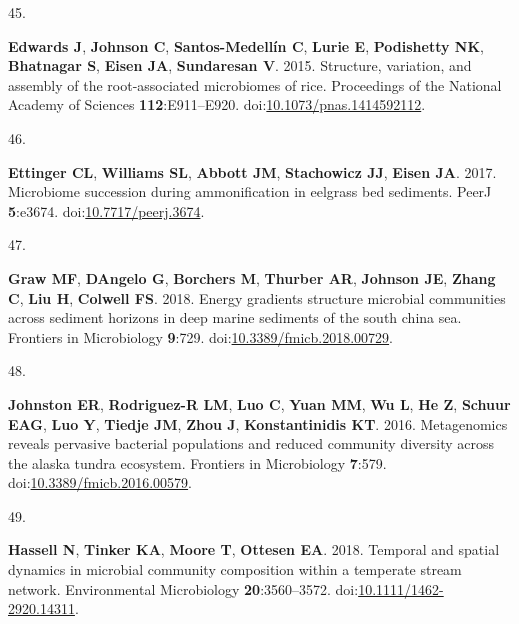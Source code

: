\documentclass[
]{article}
\newlength{\cslhangindent}
\newlength{\csllabelwidth}
\newlength{\cslentryspacingunit} %
\newenvironment{CSLReferences}[2] %
 {%
  \setlength{\parindent}{0pt}
  \ifodd #1
  \let\oldpar\par
  \def\par{\hangindent=\cslhangindent\oldpar}
  \fi
  \setlength{\parskip}{#2\cslentryspacingunit}
 }%
 {}
\newcommand{\CSLLeftMargin}[1]{\parbox[t]{\csllabelwidth}{#1}}
\newcommand{\CSLRightInline}[1]{\parbox[t]{\linewidth - \csllabelwidth}{#1}\break}
\begin{document}
\begin{CSLReferences}{0}{1}
\leavevmode{}%
\CSLLeftMargin{45. }%
\CSLRightInline{\textbf{Edwards J}, \textbf{Johnson C},
\textbf{Santos-Medellín C}, \textbf{Lurie E}, \textbf{Podishetty NK},
\textbf{Bhatnagar S}, \textbf{Eisen JA}, \textbf{Sundaresan V}. 2015.
Structure, variation, and assembly of the root-associated microbiomes of
rice. Proceedings of the National Academy of Sciences
\textbf{112}:E911--E920.
doi:\href{https://doi.org/10.1073/pnas.1414592112}{10.1073/pnas.1414592112}.}

\leavevmode{}%
\CSLLeftMargin{46. }%
\CSLRightInline{\textbf{Ettinger CL}, \textbf{Williams SL},
\textbf{Abbott JM}, \textbf{Stachowicz JJ}, \textbf{Eisen JA}. 2017.
Microbiome succession during ammonification in eelgrass bed sediments.
{PeerJ} \textbf{5}:e3674.
doi:\href{https://doi.org/10.7717/peerj.3674}{10.7717/peerj.3674}.}

\leavevmode{}%
\CSLLeftMargin{47. }%
\CSLRightInline{\textbf{Graw MF}, \textbf{DAngelo G}, \textbf{Borchers
M}, \textbf{Thurber AR}, \textbf{Johnson JE}, \textbf{Zhang C},
\textbf{Liu H}, \textbf{Colwell FS}. 2018. Energy gradients structure
microbial communities across sediment horizons in deep marine sediments
of the south china sea. Frontiers in Microbiology \textbf{9}:729.
doi:\href{https://doi.org/10.3389/fmicb.2018.00729}{10.3389/fmicb.2018.00729}.}

\leavevmode{}%
\CSLLeftMargin{48. }%
\CSLRightInline{\textbf{Johnston ER}, \textbf{Rodriguez-R LM},
\textbf{Luo C}, \textbf{Yuan MM}, \textbf{Wu L}, \textbf{He Z},
\textbf{Schuur EAG}, \textbf{Luo Y}, \textbf{Tiedje JM}, \textbf{Zhou
J}, \textbf{Konstantinidis KT}. 2016. Metagenomics reveals pervasive
bacterial populations and reduced community diversity across the alaska
tundra ecosystem. Frontiers in Microbiology \textbf{7}:579.
doi:\href{https://doi.org/10.3389/fmicb.2016.00579}{10.3389/fmicb.2016.00579}.}

\leavevmode{}%
\CSLLeftMargin{49. }%
\CSLRightInline{\textbf{Hassell N}, \textbf{Tinker KA}, \textbf{Moore
T}, \textbf{Ottesen EA}. 2018. Temporal and spatial dynamics in
microbial community composition within a temperate stream network.
Environmental Microbiology \textbf{20}:3560--3572.
doi:\href{https://doi.org/10.1111/1462-2920.14311}{10.1111/1462-2920.14311}.}

\end{CSLReferences}
\end{document}
